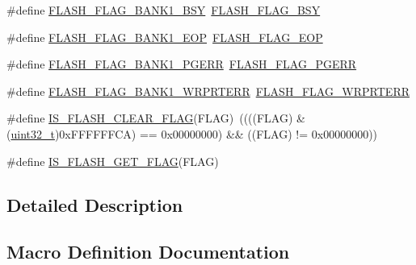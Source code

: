 \begin{DoxyCompactItemize}
\#define \hyperlink{group___f_l_a_s_h___flags_ga1f85e6d511503886e9fbe7d0228c97a4}{F\+L\+A\+S\+H\+\_\+\+F\+L\+A\+G\+\_\+\+B\+A\+N\+K1\+\_\+\+B\+SY}~\hyperlink{group___f_l_a_s_h___flags_gad3bc368f954ad7744deda3315da2fff7}{F\+L\+A\+S\+H\+\_\+\+F\+L\+A\+G\+\_\+\+B\+SY}
\item 
\#define \hyperlink{group___f_l_a_s_h___flags_gafa7670ee5ce8a2eb1f64c458a9f08e5b}{F\+L\+A\+S\+H\+\_\+\+F\+L\+A\+G\+\_\+\+B\+A\+N\+K1\+\_\+\+E\+OP}~\hyperlink{group___f_l_a_s_h___flags_gaf043ba4d8f837350bfc7754a99fae5a9}{F\+L\+A\+S\+H\+\_\+\+F\+L\+A\+G\+\_\+\+E\+OP}
\item 
\#define \hyperlink{group___f_l_a_s_h___flags_gaa1056ffdd1c434a2967d5ed7c0d263be}{F\+L\+A\+S\+H\+\_\+\+F\+L\+A\+G\+\_\+\+B\+A\+N\+K1\+\_\+\+P\+G\+E\+RR}~\hyperlink{group___f_l_a_s_h___flags_gae2ef62dee0a5ca01e6226746039b6f20}{F\+L\+A\+S\+H\+\_\+\+F\+L\+A\+G\+\_\+\+P\+G\+E\+RR}
\item 
\#define \hyperlink{group___f_l_a_s_h___flags_ga1646345adbcda773ef25785b1bdc4c43}{F\+L\+A\+S\+H\+\_\+\+F\+L\+A\+G\+\_\+\+B\+A\+N\+K1\+\_\+\+W\+R\+P\+R\+T\+E\+RR}~\hyperlink{group___f_l_a_s_h___flags_ga5c59a7f07507cac38091275964d3d35d}{F\+L\+A\+S\+H\+\_\+\+F\+L\+A\+G\+\_\+\+W\+R\+P\+R\+T\+E\+RR}
\item 
\#define \hyperlink{group___f_l_a_s_h___flags_ga82f8c6104c348d6aa47c7658ed3b6b36}{I\+S\+\_\+\+F\+L\+A\+S\+H\+\_\+\+C\+L\+E\+A\+R\+\_\+\+F\+L\+AG}(F\+L\+AG)~((((F\+L\+AG) \& (\hyperlink{_p_e___types_8h_a33594304e786b158f3fb30289278f5af}{uint32\+\_\+t})0x\+F\+F\+F\+F\+F\+F\+C\+A) == 0x00000000) \&\& ((\+F\+L\+A\+G) != 0x00000000))
\item 
\#define \hyperlink{group___f_l_a_s_h___flags_ga61b60325cd94e1608e34afc7aff20ee4}{I\+S\+\_\+\+F\+L\+A\+S\+H\+\_\+\+G\+E\+T\+\_\+\+F\+L\+AG}(F\+L\+AG)
\end{DoxyCompactItemize}


\subsection{Detailed Description}


\subsection{Macro Definition Documentation}
